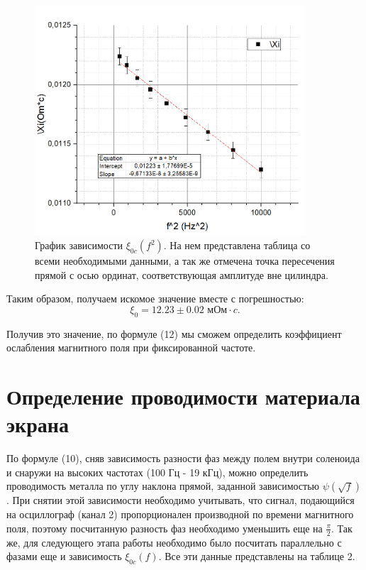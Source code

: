 \documentclass[a4paper, 14pt]{extarticle}%
\newcommand\ECaption[1]{%
     \captionsetup{font=footnotesize}%
     \caption{#1}}
\begin{document}
\begin{figure}[h!]
\begin{center}
\includegraphics[width=0.9\textwidth]{E0}
\end{center}
\ECaption{График зависимости $\xi_{0c}(f^2)$. На нем представлена таблица со всеми необходимыми данными, а так же отмечена точка пересечения прямой с осью ординат, соответствующая амплитуде вне цилиндра.}
\end{figure}

Таким образом, получаем искомое значение вместе с погрешностью:
\[\xi_0 = 12.23 \pm 0.02 \text{ мОм}\cdot c.\]

Получив это значение, по формуле (12) мы сможем определить коэффициент ослабления магнитного поля при фиксированной частоте.

\section*{Определение проводимости материала экрана}

По формуле (10), сняв зависимость разности фаз между полем внутри соленоида и снаружи на высоких частотах (100 Гц - 19 кГц), можно определить проводимость металла по углу наклона прямой, заданной зависимостью $\psi(\sqrt{f})$. При снятии этой зависимости необходимо учитывать, что сигнал, подающийся на осциллограф (канал 2) пропорционален производной по времени магнитного поля, поэтому посчитанную разность фаз необходимо уменьшить еще на $\frac{\pi}{2}$. Так же, для следующего этапа работы необходимо было посчитать параллельно с фазами еще и зависимость $\xi_{0c}(f)$. Все эти данные представлены на таблице 2.
\end{document}
